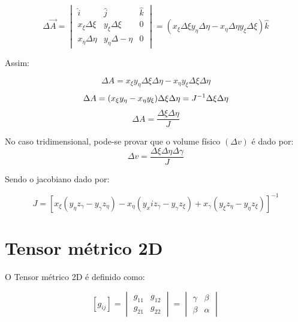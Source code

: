 \begin{equation*}
    \Delta \vec{A} =
    \begin{vmatrix}
        \hat{i} & \hat{j} & \hat{k}\\
        x_\xi \Delta \xi & y_\xi \Delta \xi & 0\\
        x_\eta \Delta \eta & y_\eta \Delta -\eta & 0
    \end{vmatrix}
    = (x_\xi \Delta \xi y_\eta \Delta \eta - x_\eta \Delta \eta y_\xi \Delta \xi)\hat{k}
\end{equation*}

Assim:

\begin{equation*}
    \Delta A = x_\xi y_\eta \Delta \xi \Delta \eta - x_\eta y_\xi \Delta \xi \Delta \eta
\end{equation*}
\begin{equation*}
    \Delta A = (x_\xi y_\eta - x_\eta y_\xi)\Delta \xi \Delta \eta = J^{-1} \Delta \xi \Delta \eta\\
\end{equation*}    
\begin{equation}
    \label{eq:3.15}
    \Delta A = \frac{\Delta \xi \Delta \eta}{J}
\end{equation}

No caso tridimensional, pode-se provar que o volume físico $(\Delta v)$ é dado por:
\begin{equation}
    \label{eq:3.16}
    \Delta v = \frac{\Delta \xi \Delta \eta \Delta \gamma}{J}
\end{equation}

Sendo o jacobiano dado por:

\begin{equation}
    \label{eq:3.17}
    J = [x_\xi(y_\eta z_\gamma - y_\gamma z_\eta) - x_\eta(y_xi z_\gamma - y_\gamma z_\xi) + x_\gamma(y_\xi z_\eta - y_\eta z_\xi)]^{-1}
\end{equation}

\section{Tensor métrico 2D}

O Tensor métrico 2D é definido como:

\begin{equation}
    \label{eq:3.18}
    [g_{ij}] =
    \begin{vmatrix}
        g_{11} & g_{12}\\
        g_{21} & g_{22}
    \end{vmatrix}
    =
    \begin{vmatrix}
        \gamma & \beta\\
        \beta & \alpha
    \end{vmatrix}
\end{equation}

